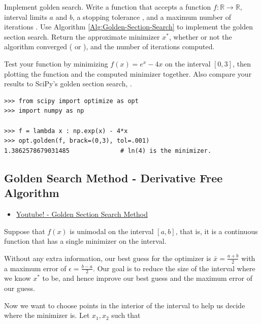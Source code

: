 \begin{problem}{Implement golden search.}
Write a function that accepts a function $f:\mathbb{R}\rightarrow\mathbb{R}$, interval limits $a$ and $b$, a stopping tolerance , and a maximum number of iterations .
Use Algorithm \ref{Alg:Golden-Section-Search} to implement the golden section search.
Return the approximate minimizer $x^*$, whether or not the algorithm converged ( or ), and the number of iterations computed.

Test your function by minimizing $f(x) = e^x - 4x$ on the interval $[0, 3]$, then plotting the function and the computed minimizer together.
Also compare your results to SciPy's golden section search, .

\begin{lstlisting}
>>> from scipy import optimize as opt
>>> import numpy as np

>>> f = lambda x : np.exp(x) - 4*x
>>> opt.golden(f, brack=(0,3), tol=.001)
1.3862578679031485              # ln(4) is the minimizer.
\end{lstlisting}
\label{prob:golden-section-search}
\end{problem}




\subsection{Golden Search Method - Derivative Free Algorithm}
\begin{resource}
\begin{itemize}
\item \href{https://www.youtube.com/watch?v=hLm8xfwWYPw}{Youtube! - Golden Section Search Method}
\end{itemize}
\end{resource}

Suppose that $f(x)$ is unimodal on the interval $[a,b]$, that is, it is a continuous function that has a single minimizer on the interval.  

Without any extra information, our best guess for the optimizer is $\bar x = \tfrac{a+ b}{2}$ with a maximum error of $\epsilon = \tfrac{b-a}{2}$.    Our goal is to reduce the size of the interval where we know $x^*$ to be, and hence improve our best guess and the maximum error of our guess.


 Now we want to choose points in the interior of the interval to help us decide where the minimizer is.  Let $x_1, x_2$ such that 

